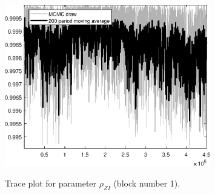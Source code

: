 \begin{figure}[H]
\centering
  \includegraphics[width=0.8\textwidth]{BRS_sectoral_wo_demand_shocks/graphs/TracePlot_rho_ZI_blck_1}\\
    \caption{Trace plot for parameter ${\rho_{ZI}}$ (block number 1).}
\end{figure}
